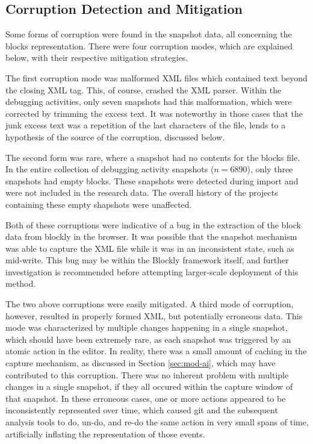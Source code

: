 \subsection{Corruption Detection and Mitigation}
Some forms of corruption were found in the snapshot data, all concerning the blocks representation. There were four corruption modes, which are explained below, with their respective mitigation strategies.

The first corruption mode was malformed XML files which contained text beyond the closing XML tag. This, of course, crashed the XML parser. Within the debugging activities, only seven snapshots had this malformation, which were corrected by trimming the excess text. It was noteworthy in those cases that the junk excess text was a repetition of the last characters of the file, lends to a hypothesis of the source of the corruption, discussed below.

The second form was rare, where a snapshot had no contents for the blocks file. In the entire collection of debugging activity snapshots ($n = 6890$), only three snapshots had empty blocks. These snapshots were detected during import and were not included in the research data. The overall history of the projects containing these empty shapshots were unaffected. 

Both of these corruptions were indicative of a bug in the extraction of the block data from blockly in the browser. It was possible that the snapshot mechanism was able to capture the XML file while it was in an inconsistent state, such as mid-write. This bug may be within the Blockly framework itself, and further investigation is recommended before attempting larger-scale deployment of this method.

The two above corruptions were easily mitigated. A third mode of corruption, however, resulted in properly formed XML, but potentially erroneous data. This mode was characterized by multiple changes happening in a single snapshot, which should have been extremely rare, as each snapshot was triggered by an atomic action in the editor. In reality, there was a small amount of caching in the capture mechanism, as discussed in Section \ref{sec:mod-ai}, which may have contributed to this corruption. There was no inherent problem with multiple changes in a single snapshot, if they all occured within the capture window of that snapshot. In these erroneous cases, one or more actions appeared to be inconsistently represented over time, which caused git and the subsequent analysis tools to do, un-do, and re-do the same action in very small spans of time, artificially inflating the representation of those events. 

